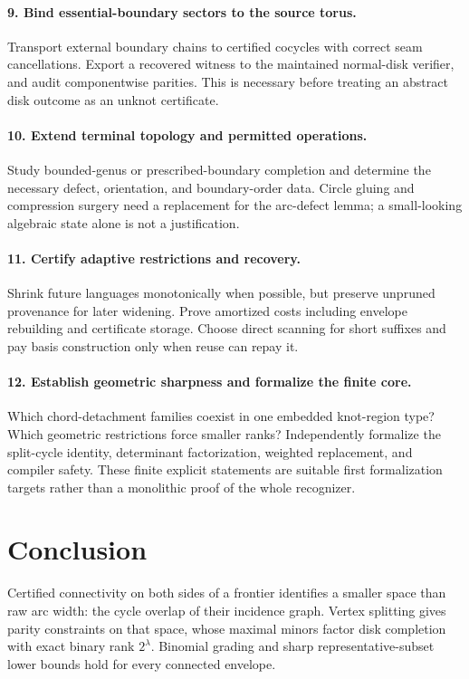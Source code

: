 \documentclass[11pt,a4paper]{article}
\theoremstyle{definition}
\theoremstyle{remark}
\begin{document}
\paragraph{9. Bind essential-boundary sectors to the source torus.}
Transport external boundary chains to certified cocycles with correct seam cancellations.
Export a recovered witness to the maintained normal-disk verifier, and audit componentwise
parities. This is necessary before treating an abstract disk outcome as an unknot certificate.

\paragraph{10. Extend terminal topology and permitted operations.}
Study bounded-genus or prescribed-boundary completion and determine the necessary defect,
orientation, and boundary-order data. Circle gluing and compression surgery need a replacement
for the arc-defect lemma; a small-looking algebraic state alone is not a justification.

\paragraph{11. Certify adaptive restrictions and recovery.}
Shrink future languages monotonically when possible, but preserve unpruned provenance
for later widening. Prove amortized costs including envelope rebuilding and certificate
storage. Choose direct scanning for short suffixes and pay basis construction only when
reuse can repay it.

\paragraph{12. Establish geometric sharpness and formalize the finite core.}
Which chord-detachment families coexist in one embedded knot-region type? Which geometric
restrictions force smaller ranks? Independently formalize the split-cycle identity,
determinant factorization, weighted replacement, and compiler safety. These finite explicit
statements are suitable first formalization targets rather than a monolithic proof of the
whole recognizer.

\section{Conclusion}
Certified connectivity on both sides of a frontier identifies a smaller space than raw
arc width: the cycle overlap of their incidence graph. Vertex splitting gives parity
constraints on that space, whose maximal minors factor disk completion with exact binary
rank $2^\lambda$. Binomial grading and sharp representative-subset lower bounds hold for
every connected envelope.
\end{document}

